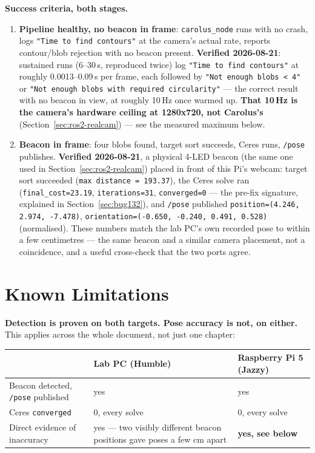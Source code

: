 \documentclass[11pt]{report}
\begin{document}
\textbf{Success criteria, both stages.}

\begin{enumerate}
  \item \textbf{Pipeline healthy, no beacon in frame}: \texttt{carolus\_node}
  runs with no crash, logs \texttt{"Time to find contours"} at the camera's
  actual rate, reports contour/blob rejection with no beacon present.
  \textbf{Verified 2026-08-21}: sustained runs (6--30\,s, reproduced twice)
  log \texttt{"Time to find contours"} at roughly 0.0013--0.09\,s per frame,
  each followed by
  \texttt{"Not enough blobs < 4"} or \texttt{"Not enough blobs with required
  circularity"} --- the correct result with no beacon in view, at roughly
  10\,Hz once warmed up. \textbf{That 10\,Hz is the camera's hardware
  ceiling at 1280x720, not Carolus's} (Section~\ref{sec:ros2-realcam}) ---
  see the measured maximum below.
  \item \textbf{Beacon in frame}: four blobs found, target sort succeeds,
  Ceres runs, \texttt{/pose} publishes. \textbf{Verified 2026-08-21}, a
  physical 4-LED beacon (the same one used in Section~\ref{sec:ros2-realcam})
  placed in front of this Pi's webcam: target sort succeeded
  (\texttt{max distance = 193.37}), the Ceres solve ran
  (\texttt{final\_cost=23.19}, \texttt{iterations=31}, \texttt{converged=0}
  --- the pre-fix signature, explained in Section~\ref{sec:bug132}), and
  \texttt{/pose} published
  \texttt{position=(4.246, 2.974, -7.478)},
  \texttt{orientation=(-0.650, -0.240, 0.491, 0.528)} (normalised). These
  numbers match the lab PC's own recorded pose to within a few centimetres
  --- the same beacon and a similar camera placement, not a coincidence, and
  a useful cross-check that the two ports agree.
\end{enumerate}

\chapter*{Known Limitations}

\textbf{Detection is proven on both targets. Pose accuracy is not, on
either.} This applies across the whole document, not just one chapter:

\begin{center}
\begin{tabular}{@{}p{}p{}p{}@{}}
\toprule
 & \textbf{Lab PC (Humble)} & \textbf{Raspberry Pi 5 (Jazzy)} \\
\midrule
Beacon detected, \texttt{/pose} published & yes & yes \\
\addlinespace
Ceres \texttt{converged} & 0, every solve & 0, every solve \\
\addlinespace
Direct evidence of inaccuracy & yes --- two visibly different beacon
positions gave poses a few cm apart & \textbf{yes, see below} \\
\bottomrule
\end{tabular}
\end{center}
\end{document}
